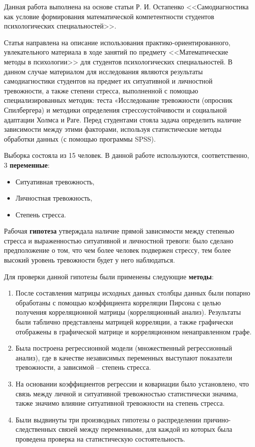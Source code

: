 \documentclass{../../common/thesisbyxetex}
\begin{document}
Данная работа выполнена на основе статьи  Р. И. Остапенко <<Самодиагностика как условие 
формирования математической компетентности студентов психологических специальностей>>\cite{ostap}.

Статья направлена на описание использования практико-ориентированного, увлекательного материала в 
ходе занятий по предмету <<Математические методы в психологии>> для студентов психологических 
специальностей. В данном случае материалом для исследования являются результаты самодиагностики 
студентов на предмет их ситуативной и личностной тревожности, а также степени стресса, выполненной 
с помощью специализированных методик: теста «Исследование тревожности (опросник Спилбергера) и 
методики определения стрессоустойчивости и социальной адаптации Холмса и Раге. Перед студентами 
стояла задача  определить наличие зависимости между этими факторами, используя статистические 
методы обработки данных (с помощью программы SPSS).  

Выборка состояла из 15 человек. В данной работе используются, соответственно, 3 \textbf{переменные}:
\begin{itemize}
 \item Ситуативная тревожность,
 \item Личностная тревожность,
 \item Степень стресса.
\end{itemize}

Рабочая \textbf{гипотеза} утверждала наличие прямой зависимости между степенью стресса и 
выраженностью ситуативной и личностной тревоги: было сделано предположение о том, что чем более 
человек подвержен стрессу, тем более высокий уровень тревожности будет у него наблюдаться.

Для проверки данной гипотезы были  применены следующие \textbf{методы}:

\begin{enumerate}

 \item После составления матрицы исходных данных столбцы данных были попарно обработаны с помощью 
коэффициента корреляции Пирсона с целью получения корреляционной матрицы (корреляционный анализ). 
Результаты были таблично представлены матрицей корреляции, а также графически отображены в 
графической матрице и корреляционном ненаправленном графе.

\item Была построена регрессионной модели (множественный регрессионный анализ), где в 
качестве независимых переменных выступают показатели тревожности, а зависимой – степень стресса.
\item На основании коэффициентов регрессии и ковариации было установлено, что связь между 
личной и ситуативной тревожностью статистически значима, также значимо влияние ситуативной 
тревожности на степень стресса.
\item Были выдвинуты три производных гипотезы о распределении причино-следственных связей 
между переменными, для каждой из которых была проведена проверка на статистическую состоятельность.

\end{enumerate}
\end{document}
